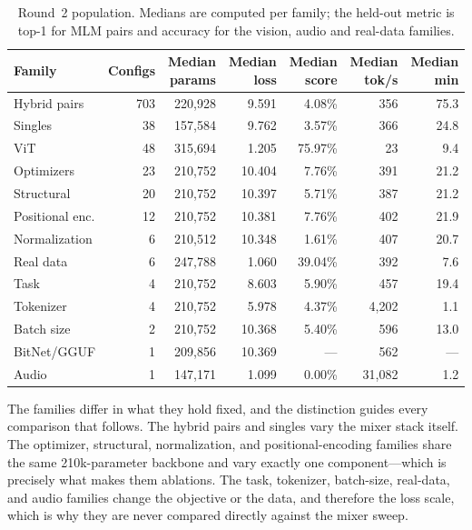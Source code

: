 \begin{table}[H]
\centering
\small
\caption{Round~2 population. Medians are computed per family; the held-out metric is top-1 for MLM pairs and accuracy for the vision, audio and real-data families.}
\label{tab:round2-families}
\begin{tabular}{lrrrrrr}
\toprule
Family & Configs & Median params & Median loss & Median score & Median tok/s & Median min \\
\midrule
Hybrid pairs      & 703 & 220{,}928 & 9.591 & 4.08\%  & 356 & 75.3 \\
Singles           & 38  & 157{,}584 & 9.762 & 3.57\%  & 366 & 24.8 \\
ViT               & 48  & 315{,}694 & 1.205 & 75.97\% & 23  & 9.4  \\
Optimizers        & 23  & 210{,}752 & 10.404 & 7.76\% & 391 & 21.2 \\
Structural        & 20  & 210{,}752 & 10.397 & 5.71\% & 387 & 21.2 \\
Positional enc.   & 12  & 210{,}752 & 10.381 & 7.76\% & 402 & 21.9 \\
Normalization     & 6   & 210{,}512 & 10.348 & 1.61\% & 407 & 20.7 \\
Real data         & 6   & 247{,}788 & 1.060 & 39.04\% & 392 & 7.6  \\
Task              & 4   & 210{,}752 & 8.603 & 5.90\% & 457 & 19.4 \\
Tokenizer         & 4   & 210{,}752 & 5.978 & 4.37\% & 4{,}202 & 1.1 \\
Batch size        & 2   & 210{,}752 & 10.368 & 5.40\% & 596 & 13.0 \\
BitNet/GGUF       & 1   & 209{,}856 & 10.369 & ---    & 562 & ---  \\
Audio             & 1   & 147{,}171 & 1.099 & 0.00\%  & 31{,}082 & 1.2 \\
\bottomrule
\end{tabular}
\end{table}

The families differ in what they hold fixed, and the distinction guides every comparison that follows. The hybrid pairs and singles vary the mixer stack itself. The optimizer, structural, normalization, and positional-encoding families share the same 210k-parameter backbone and vary exactly one component---which is precisely what makes them ablations. The task, tokenizer, batch-size, real-data, and audio families change the objective or the data, and therefore the loss scale, which is why they are never compared directly against the mixer sweep.

